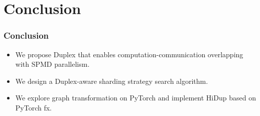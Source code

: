 \documentclass[12pt,aspectratio=169]{beamer}
\begin{document}
    \section{Conclusion}

    \begin{frame}
        \frametitle{Conclusion}

        \begin{itemize}
            \setlength{\itemsep}{.8em}
            \item We propose Duplex that enables computation-communication overlapping with SPMD parallelism.
            \item We design a Duplex-aware sharding strategy search algorithm.
            \item We explore graph transformation on PyTorch and implement HiDup based on PyTorch fx.
        \end{itemize}
    \end{frame}

    \appendix

\end{document}
